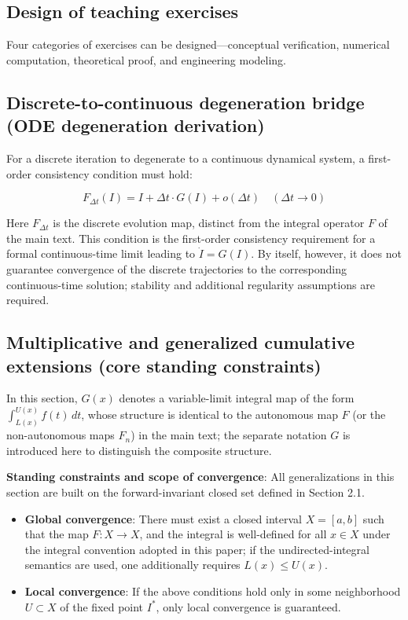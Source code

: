 \documentclass[11pt,a4paper]{amsart}
\begin{document}
\subsection{Design of teaching exercises}
Four categories of exercises can be designed---conceptual verification, numerical computation, theoretical proof, and engineering modeling.

\subsection{Discrete-to-continuous degeneration bridge (ODE degeneration derivation)}
For a discrete iteration to degenerate to a continuous dynamical system, a first-order consistency condition must hold:

\begin{equation}
\label{eq:ode-bridge}
F_{\Delta t}(I) = I + \Delta t \cdot G(I) + o(\Delta t) \quad (\Delta t \to 0)
\end{equation}

Here $F_{\Delta t}$ is the discrete evolution map, distinct from the integral operator $F$ of the main text. This condition is the first-order consistency requirement for a formal continuous-time limit leading to $\dot{I} = G(I)$. By itself, however, it does not guarantee convergence of the discrete trajectories to the corresponding continuous-time solution; stability and additional regularity assumptions are required.

\subsection{Multiplicative and generalized cumulative extensions (core standing constraints)}

In this section, $G(x)$ denotes a variable-limit integral map of the form $\displaystyle\int_{L(x)}^{U(x)} f(t)\,dt$, whose structure is identical to the autonomous map $F$ (or the non-autonomous maps $F_n$) in the main text; the separate notation $G$ is introduced here to distinguish the composite structure.

\textbf{Standing constraints and scope of convergence}: All generalizations in this section are built on the forward-invariant closed set defined in Section 2.1.

\begin{itemize}
\item \textbf{Global convergence}: There must exist a closed interval $X = [a,b]$ such that the map $F: X \to X$, and the integral is well-defined for all $x \in X$ under the integral convention adopted in this paper; if the undirected-integral semantics are used, one additionally requires $L(x) \le U(x)$.
\item \textbf{Local convergence}: If the above conditions hold only in some neighborhood $U \subset X$ of the fixed point $I^*$, only local convergence is guaranteed.
\end{itemize}
\end{document}
